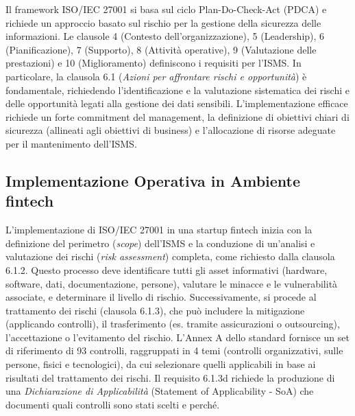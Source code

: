 Il framework ISO/IEC 27001 si basa sul ciclo Plan-Do-Check-Act (PDCA) e richiede un approccio basato sul rischio per la gestione della sicurezza delle informazioni. Le clausole 4 (Contesto dell'organizzazione), 5 (Leadership), 6 (Pianificazione), 7 (Supporto), 8 (Attività operative), 9 (Valutazione delle prestazioni) e 10 (Miglioramento) definiscono i requisiti per l'ISMS. In particolare, la clausola 6.1 (\textit{Azioni per affrontare rischi e opportunità}) è fondamentale, richiedendo l'identificazione e la valutazione sistematica dei rischi e delle opportunità legati alla gestione dei dati sensibili. L'implementazione efficace richiede un forte commitment del management, la definizione di obiettivi chiari di sicurezza (allineati agli obiettivi di business) e l'allocazione di risorse adeguate per il mantenimento dell'ISMS.

\subsection{Implementazione Operativa in Ambiente fintech}
L'implementazione di ISO/IEC 27001 in una startup fintech inizia con la definizione del perimetro (\textit{scope}) dell'ISMS e la conduzione di un'analisi e valutazione dei rischi (\textit{risk assessment}) completa, come richiesto dalla clausola 6.1.2. Questo processo deve identificare tutti gli asset informativi (hardware, software, dati, documentazione, persone), valutare le minacce e le vulnerabilità associate, e determinare il livello di rischio. Successivamente, si procede al trattamento dei rischi (clausola 6.1.3), che può includere la mitigazione (applicando controlli), il trasferimento (es. tramite assicurazioni o outsourcing), l'accettazione o l'evitamento del rischio. L'Annex A dello standard fornisce un set di riferimento di 93 controlli, raggruppati in 4 temi (controlli organizzativi, sulle persone, fisici e tecnologici), da cui selezionare quelli applicabili in base ai risultati del trattamento dei rischi. Il requisito 6.1.3d richiede la produzione di una \textit{Dichiarazione di Applicabilità} (Statement of Applicability - SoA) che documenti quali controlli sono stati scelti e perché.

